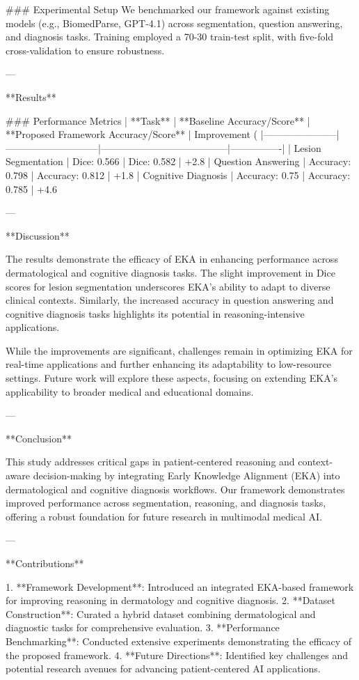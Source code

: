 ### Experimental Setup
We benchmarked our framework against existing models (e.g., BiomedParse, GPT-4.1) across segmentation, question answering, and diagnosis tasks. Training employed a 70-30 train-test split, with five-fold cross-validation to ensure robustness.

---

**Results**

### Performance Metrics
| **Task**              | **Baseline Accuracy/Score** | **Proposed Framework Accuracy/Score** | Improvement (%
|-----------------------|-----------------------------|---------------------------------------|----------------|
| Lesion Segmentation   | Dice: 0.566                | Dice: 0.582                          | +2.8%
| Question Answering    | Accuracy: 0.798            | Accuracy: 0.812                      | +1.8%
| Cognitive Diagnosis   | Accuracy: 0.75             | Accuracy: 0.785                      | +4.6%

---

**Discussion**

The results demonstrate the efficacy of EKA in enhancing performance across dermatological and cognitive diagnosis tasks. The slight improvement in Dice scores for lesion segmentation underscores EKA's ability to adapt to diverse clinical contexts. Similarly, the increased accuracy in question answering and cognitive diagnosis tasks highlights its potential in reasoning-intensive applications.

While the improvements are significant, challenges remain in optimizing EKA for real-time applications and further enhancing its adaptability to low-resource settings. Future work will explore these aspects, focusing on extending EKA's applicability to broader medical and educational domains.

---

**Conclusion**

This study addresses critical gaps in patient-centered reasoning and context-aware decision-making by integrating Early Knowledge Alignment (EKA) into dermatological and cognitive diagnosis workflows. Our framework demonstrates improved performance across segmentation, reasoning, and diagnosis tasks, offering a robust foundation for future research in multimodal medical AI.

---

**Contributions**

1. **Framework Development**: Introduced an integrated EKA-based framework for improving reasoning in dermatology and cognitive diagnosis.
2. **Dataset Construction**: Curated a hybrid dataset combining dermatological and diagnostic tasks for comprehensive evaluation.
3. **Performance Benchmarking**: Conducted extensive experiments demonstrating the efficacy of the proposed framework.
4. **Future Directions**: Identified key challenges and potential research avenues for advancing patient-centered AI applications.  